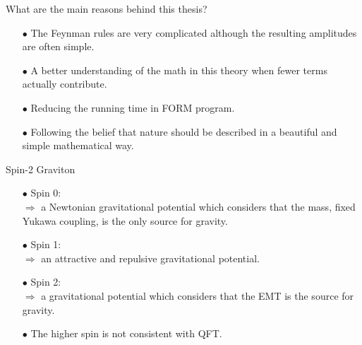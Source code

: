 \documentclass[aspectratio=169,usenames,dvipsnames]{beamer}
\begin{document}
\begin{frame}{What are the main reasons behind this thesis?}
  \begin{itemize}
  \item[$\bullet$]  The Feynman rules are very complicated although the resulting amplitudes are often simple.
    \vspace{8mm}
  \item[$\bullet$]
    A better understanding of the math in this theory when fewer terms actually contribute.
    \vspace{8mm}
  \item[$\bullet$]  Reducing the running time in FORM program.
    \vspace{8mm}
  \item[$\bullet$]  Following the belief that nature should be described in a beautiful and simple mathematical way.
    \vspace{8mm}
  \end{itemize}
\end{frame}

\begin{frame}{Spin-2 Graviton}
  \begin{itemize}
    \item[$\bullet$] Spin 0: \\
     $\Rightarrow$ \quad a Newtonian gravitational potential which considers that the mass, fixed Yukawa coupling, is the only source for gravity.
    \linebreak
    \item[$\bullet$] Spin 1: \\
     $\Rightarrow$ \quad an attractive and repulsive gravitational potential.
    \linebreak
    \item[$\bullet$] Spin 2: \\
     $\Rightarrow$ \quad a gravitational potential which considers that the EMT is the source for gravity.
    \linebreak
    \item[$\bullet$] The higher spin is not consistent with QFT. 
  \end{itemize}
\end{frame}


\end{document}
